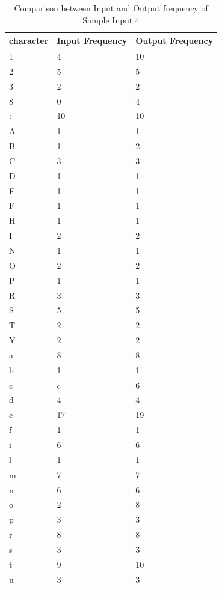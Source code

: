\begin{table}[H]
\centering
\begin{tabular}{|p{2cm}|p{2cm}|p{2cm}|}
\hline
character & Input Frequency & Output Frequency \\
\hline
1 & 4  & 10\\
\hline
2 & 5  & 5\\
\hline
3 & 2  & 2\\
\hline
8 & 0  & 4\\
\hline
: & 10 & 10\\
\hline
A & 1  & 1\\
\hline
B & 1  & 2\\
\hline
C & 3  & 3\\
\hline
D & 1  & 1\\
\hline
E & 1  & 1\\
\hline
F & 1  & 1\\
\hline
H & 1  & 1\\
\hline
I & 2  & 2\\
\hline
N & 1  & 1\\
\hline
O & 2  & 2\\
\hline
P & 1  & 1\\
\hline
R & 3  & 3\\
\hline
S & 5  & 5\\
\hline
T & 2  & 2\\
\hline
Y & 2  & 2\\
\hline
a & 8  & 8\\
\hline
b & 1  & 1\\
\hline
c & c  & 6\\
\hline
d & 4  & 4\\
\hline
e & 17 & 19\\
\hline
f & 1  & 1\\
\hline
i & 6  & 6\\
\hline
l & 1  & 1\\
\hline
m & 7  & 7\\
\hline
n & 6  & 6\\
\hline
o & 2  & 8\\
\hline
p & 3  & 3\\
\hline
r & 8  & 8\\
\hline
s & 3  & 3\\
\hline
t & 9  & 10\\
\hline
u & 3  & 3\\
\hline
\end{tabular}
\caption {Comparison between Input and Output frequency of Sample Input 4}
\label {tab:Table4}
\end{table}

